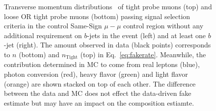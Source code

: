 \begin{figure}[h!]
{}
\vspace{-10mm}\caption{Transverse momentum distributions \pt\ of tight probe muons (top) and loose OR tight probe muons (bottom) passing signal selection criteria in the control Same-Sign $\mu-\mu$ control region without any additional requirement on $b$-jets in the event (left) and at least one $b$-jet (right). 
The amount observed in data (black points) corresponds to $n$ (bottom) and $n_{\textrm{Tight}}$ (top) in Eq.~\ref{eq:fakerate}. 
Meanwhile, the contribution determined in MC to come from real leptons (blue), photon conversion (red), heavy flavor (green) and light
flavor (orange) are shown stacked on top of each other. 
The difference between the data and MC does not effect the data-driven
fake estimate but may have an impact on the composition estiamte.
}
\label{fig:fakeEff_CRs_muon_stacked}
\end{figure}


